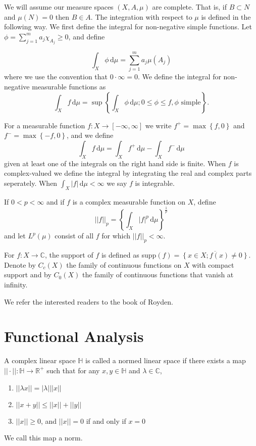 We will assume our measure spaces $(X,A,\mu)$ are complete.
That is, if $B \subset N$ and $\mu(N) = 0$ then $B \in A$.
The integration with respect to $\mu$ is defined in the following way.
We first define the integral for non-negative simple functions.
Let $\phi = \sum_{j=1}^m a_{j} \chi_{A_{j}} \geq 0$, and define 

\[
\int_{ X} \! \phi \, \mathrm{d}\mu = \sum_{j=1}^m a_{j} \mu(A_{j})
\] 
where we use the convention that $0 \cdot \infty = 0$.
We define the integral for non-negative measurable functions as
\[
  \int_{ X} \! f \, \mathrm{d}\mu = \sup \left\{ \int_{ X} \! \phi \, \mathrm{d}\mu ; 0 \leq \phi \leq f, \phi \text{ simple}  \right\} 
.\] 

For a measurable function $ f : X \to [-\infty,\infty] $ we write $f^{+} = \max \left\{ f,0 \right\}$ and $f^{-} = \max \left\{ -f,0 \right \}$, and we define
\[
\int_{ X} \! f \, \mathrm{d}\mu = \int_{ X} \! f^{+} \, \mathrm{d}\mu - \int_{ X} \! f^{-} \, \mathrm{d}\mu  
\] 
given at least one of the integrals on the right hand side is finite.
When $f$ is complex-valued we define the integral by integrating the real and complex parts seperately.
When $\int_{ X} \! |f| \, \mathrm{d}\mu < \infty $ we say $f$ is integrable.

\begin{definition}
  If $0 < p < \infty$ and if $f$ is a complex measurable function on $X$, define
  \[
    ||f||_{p} = \left\{ \int_{ X} \! |f|^{p} \, \mathrm{d}\mu  \right\}^{\frac{1}{p}}
  \] 
  and let $L^{p}(\mu)$ consist of all $f$ for which $||f||_{p} < \infty$.
\end{definition}

For $ f : X \to \mathbb{C} $, the support of $f$ is defined as supp$(f) = \overline{\left\{ x \in X; f(x) \not = 0 \right\}} $.
Denote by $C_{c}(X)$ the family of continuous functions on $X$ with compact support and by $C_{0}(X)$ the family of continuous functions that vanish at infinity.

We refer the interested readers to the book of Royden\cite{royden}.


\break



\section{Functional Analysis}

\begin{definition}
A complex linear space $\mathbb{H}$ is called a normed linear space if there exists a map $|| \cdot || : \mathbb{H} \to \mathbb{R}^{+} $ such that for any $x, y \in \mathbb{H}$ and $ \lambda \in \mathbb{C}$,

\begin{enumerate}
  \item $|| \lambda x || = |\lambda| || x ||$
  \item $|| x + y || \leq || x || + || y ||  $
  \item $|| x || \geq 0$, and $|| x || = 0$ if and only if $x = 0$
\end{enumerate}

We call this map a norm.
\end{definition}

